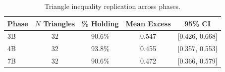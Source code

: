 \begin{table}[t]
\centering
\caption{Triangle inequality replication across phases.}
\label{tab:triangle}
\small
\begin{tabular}{lcccc}
\toprule
Phase & $N$ Triangles & \% Holding & Mean Excess & 95\% CI \\
\midrule
    3B & 32 & 90.6\% & 0.547 & [0.426, 0.668] \\
    4B & 32 & 93.8\% & 0.455 & [0.357, 0.553] \\
    7B & 32 & 90.6\% & 0.472 & [0.366, 0.579] \\
\bottomrule
\end{tabular}
\end{table}
